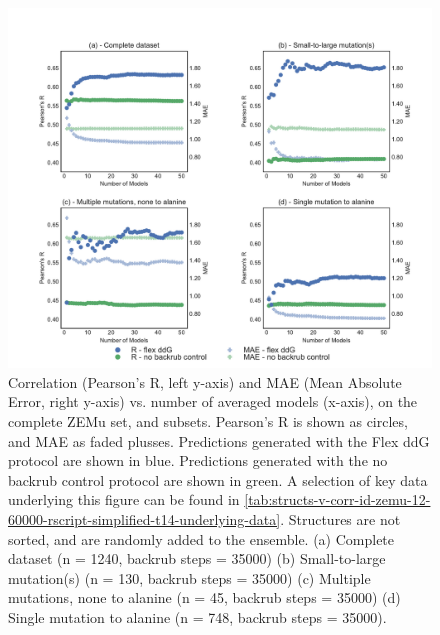 \begin{figure}
  \includegraphics[width=\textwidth,keepaspectratio]{structs-v-corr-id-zemu-12-60000-rscript-simplified-t14.pdf}
  \caption[]{
    Correlation (Pearson's R, left y-axis) and MAE (Mean Absolute Error, right y-axis) vs. number of averaged models (x-axis), on the complete ZEMu set, and subsets.
    Pearson's R is shown as circles, and MAE as faded plusses.
Predictions generated with the Flex ddG protocol are shown in blue.
Predictions generated with the no backrub control protocol are shown in green.
    A selection of key data underlying this figure can be found in \cref{tab:structs-v-corr-id-zemu-12-60000-rscript-simplified-t14-underlying-data}.
    Structures are not sorted, and are randomly added to the ensemble. 
    (a) Complete dataset (n = 1240, backrub steps = 35000)
    (b) Small-to-large mutation(s) (n = 130, backrub steps = 35000)
    (c) Multiple mutations, none to alanine (n = 45, backrub steps = 35000)
    (d) Single mutation to alanine (n = 748, backrub steps = 35000).
  } \label{fig:structs-v-corr-id-zemu-12-60000-rscript-simplified-t14}
\end{figure}

